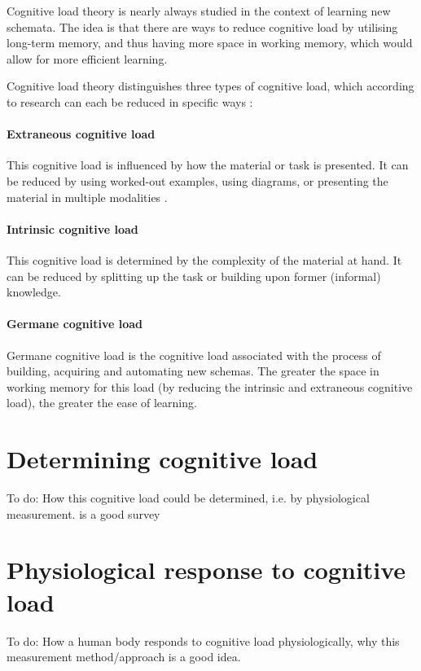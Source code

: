\documentclass[11pt,leqno,letterpaper]{report} %
\begin{document}
Cognitive load theory is nearly always studied in the context of learning new schemata. The idea is that there are ways to reduce cognitive load by utilising long-term memory, and thus having more space in working memory, which would allow for more efficient learning.

Cognitive load theory distinguishes three types of cognitive load, which according to research can each be reduced in specific ways \citep{mayer2002multimedia}:


\paragraph{Extraneous cognitive load}
This cognitive load is influenced by how the material or task is presented. It can be reduced by using worked-out examples, using diagrams, or presenting the material in multiple modalities \citep{mousavi1995reducing}.

\paragraph{Intrinsic cognitive load}
This cognitive load is determined by the complexity of the material at hand. It can be reduced by splitting up the task or building upon former (informal) knowledge.

\paragraph{Germane cognitive load}
Germane cognitive load is the cognitive load associated with the process of building, acquiring and automating new schemas. The greater the space in working memory for this load (by reducing the intrinsic and extraneous cognitive load), the greater the ease of learning.


\section{Determining cognitive load}
To do: How this cognitive load could be determined, i.e. by physiological measurement.
\citep{brunken2003direct} is a good survey

\section{Physiological response to cognitive load}
To do: How a human body responds to cognitive load physiologically, why this measurement method/approach is a good idea. 
\end{document}

